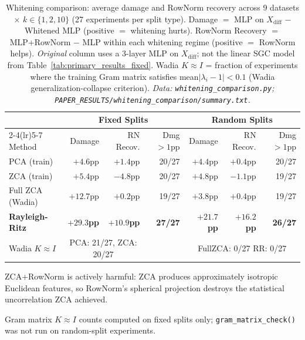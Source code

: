 \documentclass[11pt]{article}
\begin{document}
\begin{table}[H]
\centering\small\setlength{\tabcolsep}{5pt}
\caption{Whitening comparison: average damage and RowNorm recovery across
9 datasets $\times$ $k \in \{1,2,10\}$ (27 experiments per split type).
Damage $=$ MLP on $X_{\mathrm{diff}}$ $-$ Whitened MLP (positive $=$ whitening hurts).
RowNorm Recovery $=$ MLP+RowNorm $-$ MLP within each whitening regime
(positive $=$ RowNorm helps).
\textit{Original} column uses a 3-layer MLP on $X_{\mathrm{diff}}$; not the
linear SGC model from Table~\ref{tab:primary_results_fixed}.
Wadia $K{\approx}I$ = fraction of experiments where the training Gram matrix
satisfies mean$|\lambda_i{-}1| < 0.1$ (Wadia generalization-collapse criterion).
\textit{\scriptsize Data: \texttt{whitening\_comparison.py};
\texttt{PAPER\_RESULTS/whitening\_comparison/summary.txt}.}}
\label{tab:whitening_comparison}
\begin{tabular}{lrrrrrr}
\toprule
 & \multicolumn{3}{c}{Fixed Splits} & \multicolumn{3}{c}{Random Splits} \\
\cmidrule(lr){2-4}\cmidrule(lr){5-7}
Method & Damage & RN Recov. & Dmg $>1$pp & Damage & RN Recov. & Dmg $>1$pp \\
\midrule
PCA (train)     & $+4.6$pp  & $+1.4$pp           & 20/27 & $+4.4$pp  & $+0.4$pp  & 20/27 \\
ZCA (train)     & $+5.4$pp  & $-4.8$pp\tnote{†}  & 20/27 & $+4.8$pp  & $-1.1$pp  & 19/27 \\
Full ZCA (Wadia)& $+12.7$pp & $+0.2$pp           & 19/27 & $+3.8$pp  & $+0.4$pp  & 19/27 \\
\textbf{Rayleigh-Ritz} & $\mathbf{+29.3}$\textbf{pp} & $\mathbf{+10.9}$\textbf{pp} & \textbf{27/27} & $\mathbf{+21.7}$\textbf{pp} & $\mathbf{+16.2}$\textbf{pp} & \textbf{26/27} \\
\midrule
Wadia $K{\approx}I$\tnote{‡} & \multicolumn{2}{c}{PCA: 21/27, ZCA: 20/27} & & \multicolumn{3}{c}{FullZCA: 0/27 \quad RR: 0/27} \\
\bottomrule
\end{tabular}
\begin{tablenotes}\small
\item[†] ZCA+RowNorm is actively harmful: ZCA produces approximately isotropic
Euclidean features, so RowNorm's spherical projection destroys the statistical
uncorrelation ZCA achieved.
\item[‡] Gram matrix $K{\approx}I$ counts computed on fixed splits only;
\texttt{gram\_matrix\_check()} was not run on random-split experiments.
\end{tablenotes}
\end{table}
\end{document}
